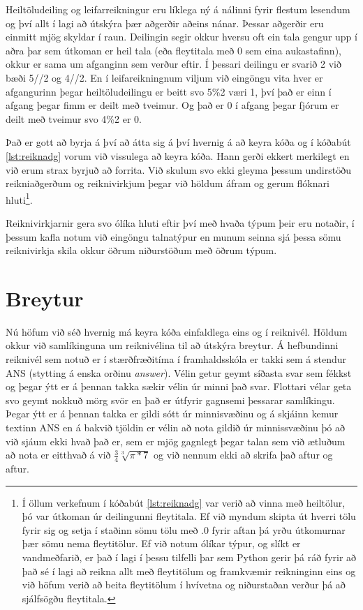 \begin{valBox}
	Heiltöludeiling og leifarreikningur eru líklega ný á nálinni fyrir flestum lesendum og því allt í lagi að útskýra þær aðgerðir aðeins nánar.
	Þessar aðgerðir eru einmitt mjög skyldar í raun.
	Deilingin segir okkur hversu oft ein tala gengur upp í aðra þar sem útkoman er heil tala (eða fleytitala með 0 sem eina aukastafinn), okkur er sama um afganginn sem verður eftir.
	Í þessari deilingu er svarið 2 við bæði 5//2 og 4//2.
	En í leifareikningnum viljum við eingöngu vita hver er afgangurinn þegar heiltöludeilingu er beitt svo 5\%2 væri 1, því það er einn í afgang þegar fimm er deilt með tveimur.
	Og það er 0 í afgang þegar fjórum er deilt með tveimur svo 4\%2 er 0.
\end{valBox}

Það er gott að byrja á því að átta sig á því hvernig á að keyra kóða og í kóðabút \ref{lst:reiknadg} vorum við vissulega að keyra kóða.
Hann gerði ekkert merkilegt en við erum strax byrjuð að forrita.
Við skulum svo ekki gleyma þessum undirstöðu reikniaðgerðum og reiknivirkjum þegar við höldum áfram og gerum flóknari hluti\footnote{
	Í öllum verkefnum í kóðabút \ref{lst:reiknadg} var verið að vinna með heiltölur, þó var útkoman úr deilingunni fleytitala. 
	Ef við myndum skipta út hverri tölu fyrir sig og setja í staðinn sömu tölu með .0 fyrir aftan þá yrðu útkomurnar þær sömu nema fleytitölur. 
	Ef við notum ólíkar týpur, og slíkt er vandmeðfarið, er það í lagi í þessu tilfelli þar sem Python gerir þá ráð fyrir að það sé í lagi að reikna allt með fleytitölum og framkvæmir reikninginn eins og við höfum verið að beita fleytitölum í hvívetna og niðurstaðan verður þá að sjálfsögðu fleytitala.
}.

Reiknivirkjarnir gera svo ólíka hluti eftir því með hvaða týpum þeir eru notaðir, í þessum kafla notum við eingöngu talnatýpur en munum seinna sjá þessa sömu reiknivirkja skila okkur öðrum niðurstöðum með öðrum týpum.

\section{Breytur}
Nú höfum við séð hvernig má keyra kóða einfaldlega eins og í reiknivél.
Höldum okkur við samlíkinguna um reiknivélina til að útskýra breytur.
Á hefbundinni reiknivél sem notuð er í stærðfræðitíma í framhaldsskóla er takki sem á stendur ANS (stytting á enska orðinu \textit{answer}).
Vélin getur geymt síðasta svar sem fékkst og þegar ýtt er á þennan takka sækir vélin úr minni það svar.
Flottari vélar geta svo geymt nokkuð mörg svör en það er útfyrir gagnsemi þessarar samlíkingu.
Þegar ýtt er á þennan takka er gildi sótt úr minnisvæðinu og á skjáinn kemur textinn ANS en á bakvið tjöldin er vélin að nota gildið úr minnissvæðinu þó að við sjáum ekki hvað það er, sem er mjög gagnlegt þegar talan sem við ætluðum að nota er eitthvað á við $\frac{3}{4}\sqrt[3]{\pi*7} $ og við nennum ekki að skrifa það aftur og aftur.

